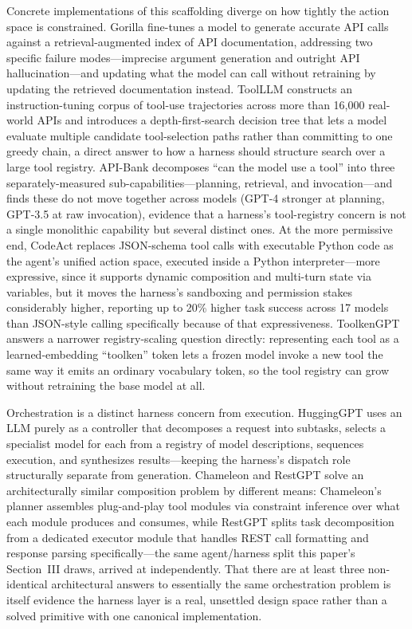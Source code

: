 \documentclass[journal]{IEEEtran}
\begin{document}
Concrete implementations of this scaffolding diverge on how tightly the action space is constrained. Gorilla \cite{patil2023gorilla} fine-tunes a model to generate accurate API calls against a retrieval-augmented index of API documentation, addressing two specific failure modes---imprecise argument generation and outright API hallucination---and updating what the model can call without retraining by updating the retrieved documentation instead. ToolLLM \cite{qin2023toolllm} constructs an instruction-tuning corpus of tool-use trajectories across more than 16,000 real-world APIs and introduces a depth-first-search decision tree that lets a model evaluate multiple candidate tool-selection paths rather than committing to one greedy chain, a direct answer to how a harness should structure search over a large tool registry. API-Bank \cite{li2023apibank} decomposes ``can the model use a tool'' into three separately-measured sub-capabilities---planning, retrieval, and invocation---and finds these do not move together across models (GPT-4 stronger at planning, GPT-3.5 at raw invocation), evidence that a harness's tool-registry concern is not a single monolithic capability but several distinct ones. At the more permissive end, CodeAct \cite{wang2024codeact} replaces JSON-schema tool calls with executable Python code as the agent's unified action space, executed inside a Python interpreter---more expressive, since it supports dynamic composition and multi-turn state via variables, but it moves the harness's sandboxing and permission stakes considerably higher, reporting up to 20\% higher task success across 17 models than JSON-style calling specifically because of that expressiveness. ToolkenGPT \cite{hao2023toolkengpt} answers a narrower registry-scaling question directly: representing each tool as a learned-embedding ``toolken'' token lets a frozen model invoke a new tool the same way it emits an ordinary vocabulary token, so the tool registry can grow without retraining the base model at all.

Orchestration is a distinct harness concern from execution. HuggingGPT \cite{shen2023hugginggpt} uses an LLM purely as a controller that decomposes a request into subtasks, selects a specialist model for each from a registry of model descriptions, sequences execution, and synthesizes results---keeping the harness's dispatch role structurally separate from generation. Chameleon \cite{lu2023chameleon} and RestGPT \cite{song2023restgpt} solve an architecturally similar composition problem by different means: Chameleon's planner assembles plug-and-play tool modules via constraint inference over what each module produces and consumes, while RestGPT splits task decomposition from a dedicated executor module that handles REST call formatting and response parsing specifically---the same agent/harness split this paper's Section~III draws, arrived at independently. That there are at least three non-identical architectural answers to essentially the same orchestration problem is itself evidence the harness layer is a real, unsettled design space rather than a solved primitive with one canonical implementation.
\end{document}
